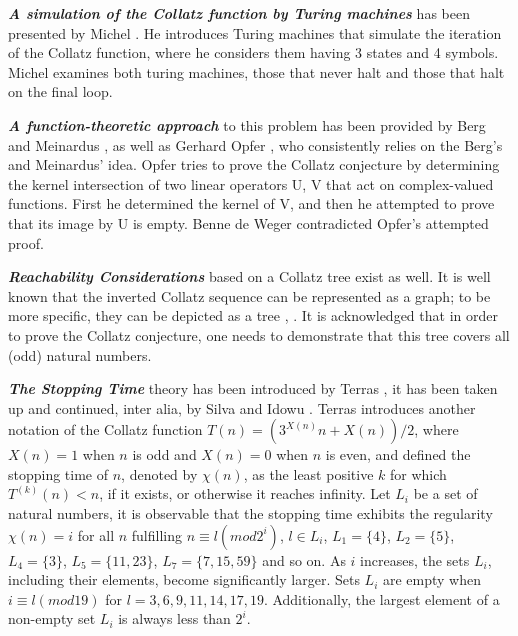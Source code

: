 \par\medskip
\textit{\textbf{A simulation of the Collatz function by Turing machines}} has been presented by Michel \cite{Ref_Michel_2014}. He introduces Turing machines that simulate the iteration of the Collatz function, where he considers them having 3 states and 4 symbols. Michel examines both turing machines, those that never halt and those that halt on the final loop.

\par\medskip
\textit{\textbf{A function-theoretic approach}} to this problem has been provided by Berg and Meinardus \cite{Ref_Berg_Meinardus_1994}, \cite{Ref_Berg_Meinardus_1995} as well as Gerhard Opfer \cite{Ref_Opfer_2011}, who consistently relies on the Berg’s and Meinardus’ idea. Opfer tries to prove the Collatz conjecture by determining the kernel intersection of two linear operators U, V that act on complex-valued functions. First he determined the kernel of V, and then he attempted to prove that its image by U is empty. Benne de Weger \cite{Ref_de_Weger_2011} contradicted Opfer’s attempted proof.

\par\medskip
\textit{\textbf{Reachability Considerations}} based on a Collatz tree exist as well. It is well known that the inverted Collatz sequence can be represented as a graph; to be more specific, they can be depicted as a tree \cite{Ref_Andrei_Masalagiu}, \cite{Ref_Kak_2014}. It is acknowledged that in order to prove the Collatz conjecture, one needs to demonstrate that this tree covers all (odd) natural numbers.

\par\medskip
\textit{\textbf{The Stopping Time}} theory has been introduced by Terras \cite{Ref_Terras_1976}, it has been taken up and continued, inter alia, by Silva \cite{Ref_Silva_1999} and Idowu \cite{Ref_Idowu_2015}. Terras introduces another notation of the Collatz function $T(n)=(3^{X(n)}n+X(n))/2$, where $X(n)=1$ when $n$ is odd and $X(n)=0$ when $n$ is even, and defined the stopping time of $n$, denoted by $\chi(n)$, as the least positive $k$ for which $T^{(k)}(n)<n$, if it exists, or otherwise it reaches infinity. Let $L_i$ be a set of natural numbers, it is observable that the stopping time exhibits the regularity $\chi(n)=i$ for all $n$ fulfilling $n\equiv l(mod 2^i)$, $l\in L_i$, $L_1=\{4\}$, $L_2=\{5\}$, $L_4=\{3\}$, $L_5=\{11,23\}$, $L_7=\{7,15,59\}$ and so on. As $i$ increases, the sets $L_i$, including their elements, become significantly larger. Sets $L_i$ are empty when $i\equiv l(mod 19)$ for $l=3,6,9,11,14,17,19$. Additionally, the largest element of a non-empty set $L_i$ is always less than $2^i$.

